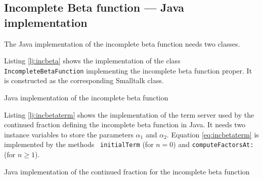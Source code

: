 \documentclass[twoside]{book}
\begin{document}
\subsection{Incomplete Beta function --- Java  implementation}
The Java implementation of the incomplete beta function
needs two classes.

Listing \ref{lj:incbeta} shows the implementation of the class
{\tt IncompleteBetaFunction} implementing the incomplete beta
function proper. It is constructed as the corresponding Smalltalk
class.

\begin{listing} Java implementation of the incomplete beta function \label{lj:incbeta}

\end{listing}

Listing \ref{lj:incbetaterm} shows the implementation of the term
server used by the continued fraction defining the incomplete beta
function in Java. It needs two instance variables to store the
parameters $\alpha_1$ and $\alpha_2$. Equation
\ref{eq:incbetaterm} is implemented by the methods {\tt
initialTerm} (for $n=0$) and {\tt computeFactorsAt:} (for $n\ge 1
$).

\begin{listing} Java implementation of the continued fraction for the incomplete beta function
\label{lj:incbetaterm}

\end{listing}

\ifx\wholebook\relax\else
\end{document}
